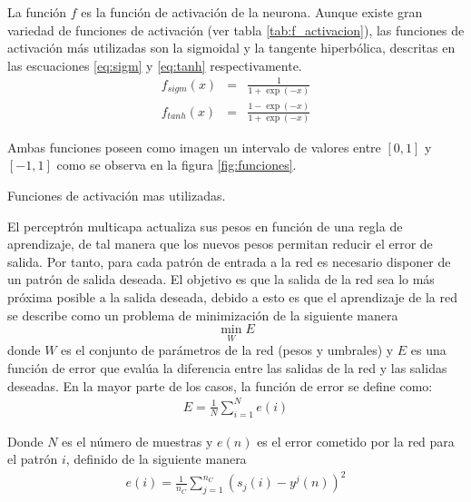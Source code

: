 La función $f$ es la función de activación de la neurona. Aunque existe gran variedad de funciones de activación (ver tabla \ref{tab:f_activacion}), las funciones de activación más utilizadas son la sigmoidal y la tangente hiperbólica, descritas en las escuaciones \ref{eq:sigm} y \ref{eq:tanh} respectivamente.
\begin{eqnarray}
	f_{sigm}(x) &=& \frac{1}{1+\exp(-x)}\label{eq:sigm}\\
	f_{tanh}(x) &=& \frac{1 - \exp(-x)}{1 + \exp(-x)}\label{eq:tanh}
\end{eqnarray}

Ambas funciones poseen como imagen un intervalo de valores entre $[0, 1]$ y $[-1, 1]$ como se observa en la figura \ref{fig:funciones}.%

\begin{imagen}
	\scalebox{1.0}{}
	\caption{Funciones de activación mas utilizadas.}
	\label{fig:funciones}
\end{imagen}


El perceptrón multicapa actualiza sus pesos en función de una regla de aprendizaje, de tal manera que los nuevos pesos permitan reducir el error de salida. Por tanto, para cada patrón de entrada a la red es necesario disponer de un patrón de salida deseada. El objetivo es que la salida de la red sea lo más próxima posible a la salida deseada, debido a esto es que el aprendizaje de la red se describe como un problema de minimización de la siguiente manera $$ \min_{W} E $$ donde $W$ es el conjunto de parámetros de la red (pesos y umbrales) y $E$ es una función de error que evalúa la diferencia entre las salidas de la red y las salidas deseadas. En la mayor parte de los casos, la función de error se define como:
\begin{eqnarray}
	E = \frac{1}{N}\sum^{N}_{i = 1} e(i)
\end{eqnarray}

Donde $N$ es el número de muestras y $e(n)$ es el error cometido por la red para el patrón $i$, definido de la siguiente manera
\begin{eqnarray}
	e(i) = \frac{1}{n_{C}}\sum^{n_{C}}_{j = 1} (s_{j}(i) - y^{j}(n))^2\label{eq:error_patron}
\end{eqnarray}

